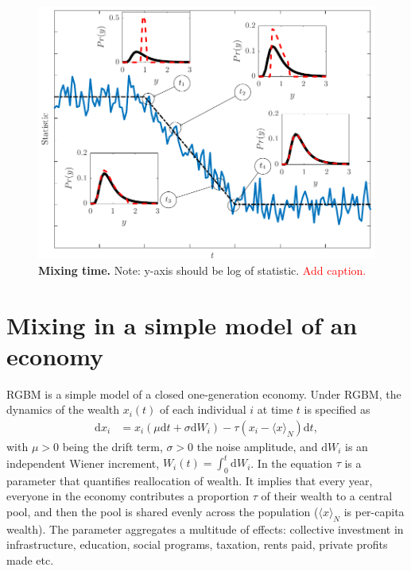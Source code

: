 \documentclass[11pt]{article}
\numberwithin{equation}{section}
\begin{document}
\begin{figure}[t!]
\includegraphics[width=\linewidth]{figs/fig_mixing_time.pdf}
\caption{\textbf{Mixing time.} Note: y-axis should be log of statistic. \textcolor{red}{Add caption.} \label{fig:mixing-time}}
\end{figure}


\section{Mixing in a simple model of an economy}\label{sec:rgbm}
RGBM is a simple model of a closed one-generation economy. Under RGBM, the dynamics of the wealth $x_i(t)$ of each individual $i$ at time $t$ is specified as
\begin{align}
    \mathrm{d} x_i &= x_i \left( \mu \mathrm{d}t + \sigma \mathrm{d}W_i \right) - \tau \left( x_i - \langle x \rangle_N \right) \mathrm{d}t,
\label{eq:rgbm}
\end{align}
with $\mu > 0$ being the drift term, $\sigma > 0$ the noise amplitude, and $\mathrm{d}W_i$ is an independent Wiener increment, $W_i(t) =\int_0^t \mathrm{d}W_i$. In the equation $\tau$ is a parameter that quantifies reallocation of wealth. It implies that every year, everyone in the economy contributes a proportion $\tau$ of their wealth to a central pool, and then the pool is shared evenly across the population ($\langle x \rangle_N$ is per-capita wealth). The parameter aggregates a multitude of effects: collective investment in infrastructure, education, social programs, taxation, rents paid, private profits made etc. 
\end{document}
